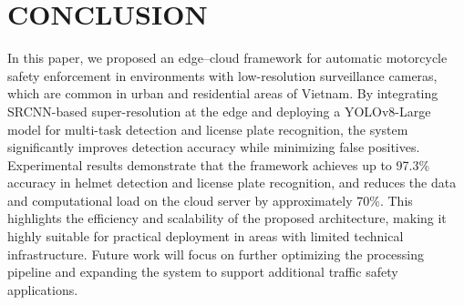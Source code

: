 \documentclass[conference]{IEEEtran}
\begin{document}
\section{CONCLUSION}

In this paper, we proposed an edge–cloud framework for automatic motorcycle safety enforcement in environments with low-resolution surveillance cameras, which are common in urban and residential areas of Vietnam. By integrating SRCNN-based super-resolution at the edge and deploying a YOLOv8-Large model for multi-task detection and license plate recognition, the system significantly improves detection accuracy while minimizing false positives. Experimental results demonstrate that the framework achieves up to 97.3\% accuracy in helmet detection and license plate recognition, and reduces the data and computational load on the cloud server by approximately 70\%. This highlights the efficiency and scalability of the proposed architecture, making it highly suitable for practical deployment in areas with limited technical infrastructure. Future work will focus on further optimizing the processing pipeline and expanding the system to support additional traffic safety applications.
\end{document}
